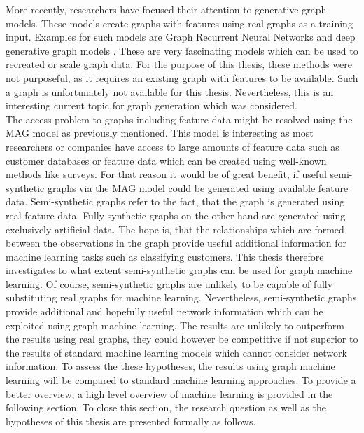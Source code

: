 	\noindent More recently, researchers have focused their attention to
	generative graph models. These models create graphs with features using
	real graphs as a training input. Examples for such models are Graph
	Recurrent Neural Networks \citep{you2018graphrnn} and deep generative graph
	models \citep{li2018learning}. These are very fascinating models which can
	be used to recreated or scale graph data. For the purpose of this thesis,
	these methods were not purposeful, as it requires an existing graph with
	features to be available. Such a graph is unfortunately not available for
	this thesis. Nevertheless, this is an interesting current topic for graph 
	generation which was considered. \\ 

	\noindent The access problem to graphs including feature data might be resolved
	using the MAG model as previously mentioned. This model is interesting as 
	most researchers or companies have access to large amounts of feature data 
	such as customer databases or feature data which can be created using 
	well-known methods like surveys. For that reason it would be of great
	benefit, if useful semi-synthetic graphs via the MAG model could be
	generated using available feature data. Semi-synthetic graphs refer to the 
	fact, that the graph is generated using real feature data. Fully synthetic 
	graphs on the other hand are generated using exclusively artificial data. 
	The hope is, that the relationships which are formed between the 
	observations in the graph provide useful additional information for machine 
	learning tasks such as classifying customers. This thesis therefore
	investigates to what extent semi-synthetic graphs can be used for graph
	machine learning. Of course, semi-synthetic graphs are unlikely to be
	capable of fully substituting real graphs for machine learning.
	Nevertheless, semi-synthetic graphs provide additional and hopefully useful
	network information which can be exploited using graph machine learning.
	The results are unlikely to outperform the results using real graphs, they
	could however be competitive if not superior to the results of standard 
	machine learning models which cannot consider network information. To assess 
	the these hypotheses, the results using graph machine learning will be 
	compared to standard machine learning approaches. To provide a better 
	overview, a high level overview of machine learning is provided in the 
	following section. To close this section, the research question as well as
	the hypotheses of this thesis are presented formally as follows. 

